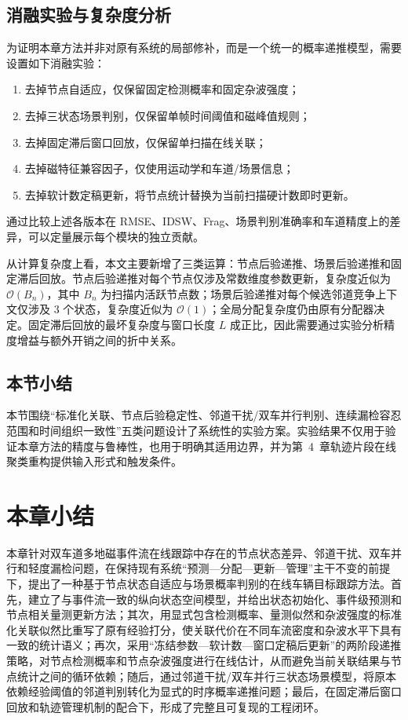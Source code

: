 \documentclass{xdupgthesis}
\begin{document}
\subsection{消融实验与复杂度分析}

为证明本章方法并非对原有系统的局部修补，而是一个统一的概率递推模型，需要设置如下消融实验：
\begin{enumerate}
	\item 去掉节点自适应，仅保留固定检测概率和固定杂波强度；
	\item 去掉三状态场景判别，仅保留单帧时间阈值和磁峰值规则；
	\item 去掉固定滞后窗口回放，仅保留单扫描在线关联；
	\item 去掉磁特征兼容因子，仅使用运动学和车道/场景信息；
	\item 去掉软计数定稿更新，将节点统计替换为当前扫描硬计数即时更新。
\end{enumerate}
通过比较上述各版本在 RMSE、IDSW、Frag、场景判别准确率和车道精度上的差异，可以定量展示每个模块的独立贡献。

从计算复杂度上看，本文主要新增了三类运算：节点后验递推、场景后验递推和固定滞后回放。节点后验递推对每个节点仅涉及常数维度参数更新，复杂度近似为 $\mathcal O(B_n)$，其中 $B_n$ 为扫描内活跃节点数；场景后验递推对每个候选邻道竞争上下文仅涉及 $3$ 个状态，复杂度近似为 $\mathcal O(1)$；全局分配复杂度仍由原有分配器决定。固定滞后回放的最坏复杂度与窗口长度 $L$ 成正比，因此需要通过实验分析精度增益与额外开销之间的折中关系。

\subsection{本节小结}

本节围绕“标准化关联、节点后验稳定性、邻道干扰/双车并行判别、连续漏检容忍范围和时间组织一致性”五类问题设计了系统性的实验方案。实验结果不仅用于验证本章方法的精度与鲁棒性，也用于明确其适用边界，并为第~4~章轨迹片段在线聚类重构提供输入形式和触发条件。

\section{本章小结}

本章针对双车道多地磁事件流在线跟踪中存在的节点状态差异、邻道干扰、双车并行和轻度漏检问题，在保持现有系统“预测—分配—更新—管理”主干不变的前提下，提出了一种基于节点状态自适应与场景概率判别的在线车辆目标跟踪方法。首先，建立了与事件流一致的纵向状态空间模型，并给出状态初始化、事件级预测和节点相关量测更新方法；其次，用显式包含检测概率、量测似然和杂波强度的标准化关联似然比重写了原有经验打分，使关联代价在不同车流密度和杂波水平下具有一致的统计语义；再次，采用“冻结参数—软计数—窗口定稿后更新”的两阶段递推策略，对节点检测概率和节点杂波强度进行在线估计，从而避免当前关联结果与节点统计之间的循环依赖；随后，通过邻道干扰/双车并行三状态场景模型，将原本依赖经验阈值的邻道判别转化为显式的时序概率递推问题；最后，在固定滞后窗口回放和轨迹管理机制的配合下，形成了完整且可复现的工程闭环。
\end{document}
